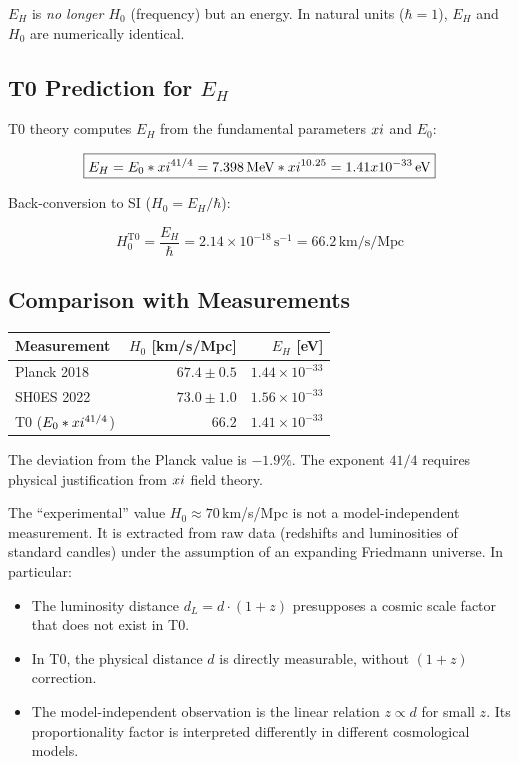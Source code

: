 $E_H$ is \emph{no longer $H_0$} (frequency) but an energy. 
In natural units ($\hbar = 1$), $E_H$ and $H_0$ are 
numerically identical.

\subsection{T0 Prediction for $E_H$}

T0 theory computes $E_H$ from the fundamental parameters 
$xi$ and $E_0$:

\begin{equation}
\boxed{E_H = E_0 * xi^{41/4} = 7.398\,\text{MeV} * xi^{10.25} = 1.41 x 10^{-33}\,\text{eV}}
\label{eq:E_H_T0}
\end{equation}

Back-conversion to SI ($H_0 = E_H / \hbar$):

\begin{equation}
H_0^{\text{T0}} = \frac{E_H}{\hbar} = 2.14 \times 10^{-18}\,\text{s}^{-1} = 66.2\,\text{km/s/Mpc}
\end{equation}

\subsection{Comparison with Measurements}

\begin{center}
\begin{tabular}{lrr}
\toprule
Measurement & $H_0$ [km/s/Mpc] & $E_H$ [eV] \\
\midrule
Planck 2018 & $67.4 \pm 0.5$ & $1.44 \times 10^{-33}$ \\
SH0ES 2022 & $73.0 \pm 1.0$ & $1.56 \times 10^{-33}$ \\
T0 ($E_0 * xi^{41/4}$) & $66.2$ & $1.41 \times 10^{-33}$ \\
\bottomrule
\end{tabular}
\end{center}

The deviation from the Planck value is $-1.9\%$. The exponent $41/4$ 
requires physical justification from $xi$ field theory.

\begin{remark}
	The ``experimental'' value $H_0 \approx 70\,$km/s/Mpc is not a 
	model-independent measurement. It is extracted from raw data (redshifts 
	and luminosities of standard candles) under the assumption of an expanding 
	Friedmann universe. In particular:
	\begin{itemize}
	\item The luminosity distance $d_L = d \cdot (1+z)$ presupposes a 
	cosmic scale factor that does not exist in T0.
	\item In T0, the physical distance $d$ is directly measurable, without 
	$(1+z)$ correction.
	\item The model-independent observation is the linear relation 
	$z \propto d$ for small $z$. Its proportionality factor is interpreted 
	differently in different cosmological models.
	\end{itemize}
\end{remark}

